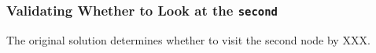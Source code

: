 








\subsubsection{Validating Whether to Look at the \texttt{second}}

The original solution determines whether to visit the second node by XXX. 









